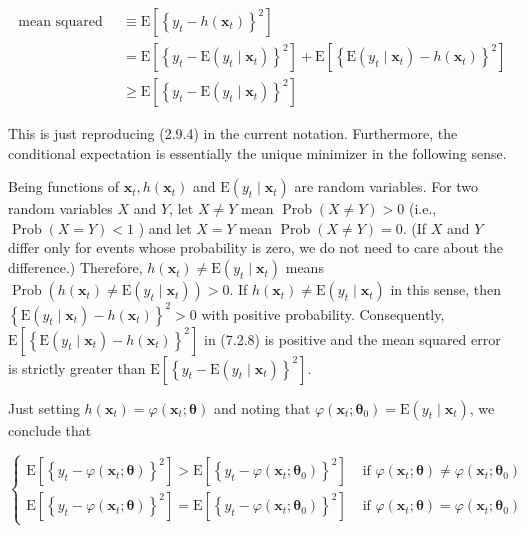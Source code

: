 \documentclass[10pt]{article}
\begin{document}
\begin{align*}
\text { mean squared error } & \equiv \mathrm{E}\left[\left\{y_{t}-h\left(\mathbf{x}_{t}\right)\right\}^{2}\right] \\
& =\mathrm{E}\left[\left\{y_{t}-\mathrm{E}\left(y_{t} \mid \mathbf{x}_{t}\right)\right\}^{2}\right]+\mathrm{E}\left[\left\{\mathrm{E}\left(y_{t} \mid \mathbf{x}_{t}\right)-h\left(\mathbf{x}_{t}\right)\right\}^{2}\right] \\
& \geq \mathrm{E}\left[\left\{y_{t}-\mathrm{E}\left(y_{t} \mid \mathbf{x}_{t}\right)\right\}^{2}\right] \tag{7.2.8}
\end{align*}


This is just reproducing (2.9.4) in the current notation. Furthermore, the conditional expectation is essentially the unique minimizer in the following sense.

Being functions of $\mathbf{x}_{t}, h\left(\mathbf{x}_{t}\right)$ and $\mathrm{E}\left(y_{t} \mid \mathbf{x}_{t}\right)$ are random variables. For two random variables $X$ and $Y$, let $X \neq Y$ mean $\operatorname{Prob}(X \neq Y)>0$ (i.e., $\operatorname{Prob}(X=Y)<1$ ) and let $X=Y$ mean $\operatorname{Prob}(X \neq Y)=0$. (If $X$ and $Y$ differ only for events whose probability is zero, we do not need to care about the difference.) Therefore, $h\left(\mathbf{x}_{t}\right) \neq \mathrm{E}\left(y_{t} \mid \mathbf{x}_{t}\right)$ means $\operatorname{Prob}\left(h\left(\mathbf{x}_{t}\right) \neq \mathrm{E}\left(y_{t} \mid \mathbf{x}_{t}\right)\right)>0$. If $h\left(\mathbf{x}_{t}\right) \neq \mathrm{E}\left(y_{t} \mid \mathbf{x}_{t}\right)$ in this sense, then $\left\{\mathrm{E}\left(y_{t} \mid \mathbf{x}_{t}\right)-h\left(\mathbf{x}_{t}\right)\right\}^{2}>0$ with positive probability. Consequently, $\mathrm{E}\left[\left\{\mathrm{E}\left(y_{t} \mid \mathbf{x}_{t}\right)-h\left(\mathbf{x}_{t}\right)\right\}^{2}\right]$ in (7.2.8) is positive and the mean squared error is strictly greater than $\mathrm{E}\left[\left\{y_{t}-\mathrm{E}\left(y_{t} \mid \mathbf{x}_{t}\right)\right\}^{2}\right]$.

Just setting $h\left(\mathbf{x}_{t}\right)=\varphi\left(\mathbf{x}_{t} ; \boldsymbol{\theta}\right)$ and noting that $\varphi\left(\mathbf{x}_{t} ; \boldsymbol{\theta}_{0}\right)=\mathrm{E}\left(y_{t} \mid \mathbf{x}_{t}\right)$, we conclude that

\[
\begin{cases}\mathrm{E}\left[\left\{y_{t}-\varphi\left(\mathbf{x}_{t} ; \boldsymbol{\theta}\right)\right\}^{2}\right]>\mathrm{E}\left[\left\{y_{t}-\varphi\left(\mathbf{x}_{t} ; \boldsymbol{\theta}_{0}\right)\right\}^{2}\right] & \text { if } \varphi\left(\mathbf{x}_{t} ; \boldsymbol{\theta}\right) \neq \varphi\left(\mathbf{x}_{t} ; \boldsymbol{\theta}_{0}\right)  \tag{7.2.9}\\ \mathrm{E}\left[\left\{y_{t}-\varphi\left(\mathbf{x}_{t} ; \boldsymbol{\theta}\right)\right\}^{2}\right]=\mathrm{E}\left[\left\{y_{t}-\varphi\left(\mathbf{x}_{t} ; \boldsymbol{\theta}_{0}\right)\right\}^{2}\right] & \text { if } \varphi\left(\mathbf{x}_{t} ; \boldsymbol{\theta}\right)=\varphi\left(\mathbf{x}_{t} ; \boldsymbol{\theta}_{0}\right)\end{cases}
\]
\end{document}
